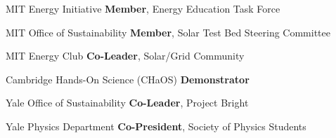 {MIT Energy Initiative}
{\textbf{Member}, Energy Education Task Force}
{}

{MIT Office of Sustainability}
{\textbf{Member}, Solar Test Bed Steering Committee}
{}

{MIT Energy Club}
{\textbf{Co-Leader}, Solar/Grid Community}
{}

{Cambridge Hands-On Science (CHaOS)}
{\textbf{Demonstrator}}
{}

{Yale Office of Sustainability}
{\textbf{Co-Leader}, Project Bright}
{}

{Yale Physics Department}
{\textbf{Co-President}, Society of Physics Students}
{}
